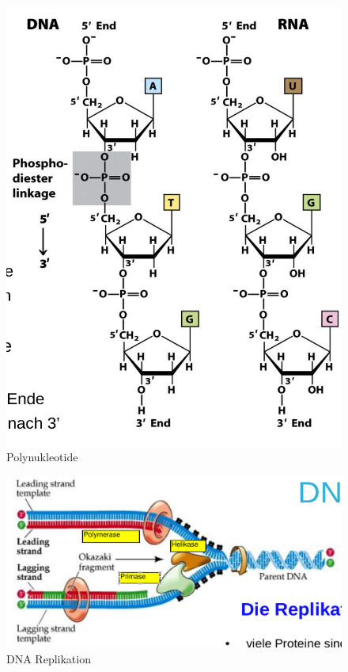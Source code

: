 \documentclass[a4paper,twocolumn,english,fontsize=7,DIV=16]{scrartcl}
\begin{document}
\begin{figure}
	\centering
	\includegraphics[width=\linewidth]{img/polynukleotide.png}
	\caption{Polynukleotide}
\end{figure}

\begin{figure}
	\centering
	\includegraphics[width=\linewidth]{img/dna_replikation.png}
	\caption{DNA Replikation}
\end{figure}
\end{document}
